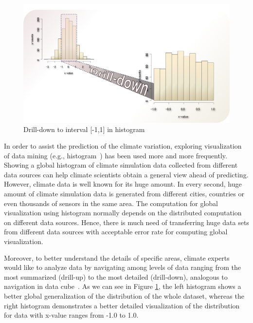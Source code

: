 \documentclass[times, 10pt,onecolumn]{article} %
\begin{document}
\begin{figure}[!iht]
\begin{center}
  \includegraphics[scale=0.45]{drill.png}
  \caption{Drill-down to interval [-1,1] in histogram}
  \label{fig:drill}
\end{center}
\end{figure}

In order to assist the prediction of the climate variation, exploring visualization of data mining (e.g., histogram~\cite{histogram}) has been used more and more frequently. Showing a global histogram of climate simulation data collected from different data sources can help climate scientists obtain a general view ahead of predicting. However, climate data is well known for its huge amount. In every second, huge amount of climate simulation data is generated from different cities, countries or even thousands of sensors in the same area. The computation for global visualization using histogram normally depends on the distributed computation on different data sources. Hence, there is much need of transferring huge data sets from different data sources with acceptable error rate for computing global visualization. 


Moreover, to better understand the details of specific areas, climate experts would like to analyze data by navigating among levels of data ranging from the most summarized (drill-up) to the most detailed (drill-down), analogous to navigation in data cube~\cite{datamining}. As we can see in Figure \ref{fig:drill}, the left histogram shows a better global generalization of the distribution of the whole dataset, whereas the right histogram demonstrates a better detailed visualization of the distribution for data with x-value ranges from -1.0 to 1.0. 
\end{document}
